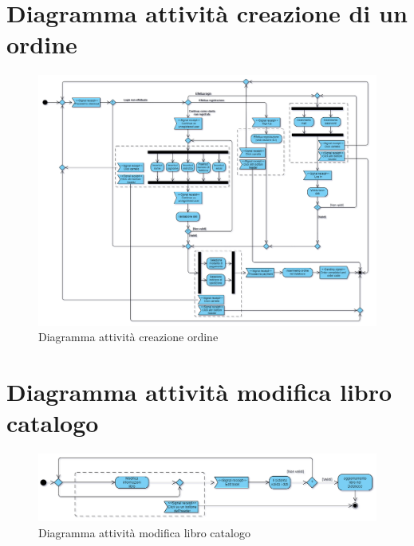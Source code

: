 \documentclass[a4paper,11pt]{report}
\begin{document}
\section{Diagramma attività creazione di un ordine}
\begin{figure}[h!]
	\centering
    	\hspace*{-0.5in}
	\includegraphics[width=1.3\linewidth]{Activity diagrams/Activity diagram creazione ordine.png}
	\caption{Diagramma attività creazione ordine}
\end{figure}

\clearpage

\section{Diagramma attività modifica libro catalogo}
\begin{figure}[h!]
	\centering
    	\hspace*{-0.5in}
	\includegraphics[width=1.3\linewidth]{Activity diagrams/editBookNew.png}
	\caption{Diagramma attività modifica libro catalogo}
\end{figure}
\end{document}

